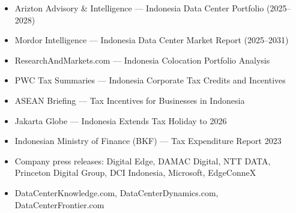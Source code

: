 \documentclass[11pt,a4paper]{article}
\begin{document}
\begin{itemize}[leftmargin=*]
    \item Arizton Advisory \& Intelligence --- Indonesia Data Center Portfolio (2025--2028)
    \item Mordor Intelligence --- Indonesia Data Center Market Report (2025--2031)
    \item ResearchAndMarkets.com --- Indonesia Colocation Portfolio Analysis
    \item PWC Tax Summaries --- Indonesia Corporate Tax Credits and Incentives
    \item ASEAN Briefing --- Tax Incentives for Businesses in Indonesia
    \item Jakarta Globe --- Indonesia Extends Tax Holiday to 2026
    \item Indonesian Ministry of Finance (BKF) --- Tax Expenditure Report 2023
    \item Company press releases: Digital Edge, DAMAC Digital, NTT DATA, Princeton Digital Group, DCI Indonesia, Microsoft, EdgeConneX
    \item DataCenterKnowledge.com, DataCenterDynamics.com, DataCenterFrontier.com
\end{itemize}
\end{document}
